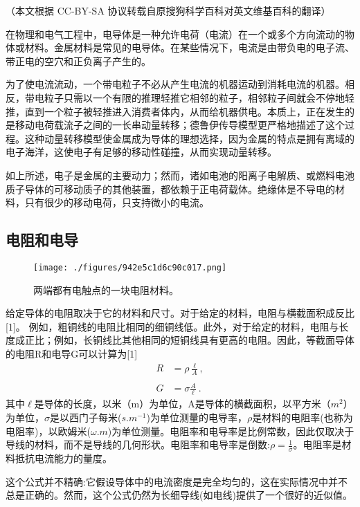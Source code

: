 
（本文根据 CC-BY-SA 协议转载自原搜狗科学百科对英文维基百科的翻译）

在物理和电气工程中，电导体是一种允许电荷（电流）在一个或多个方向流动的物体或材料。金属材料是常见的电导体。在某些情况下，电流是由带负电的电子流、带正电的空穴和正负离子产生的。

为了使电流流动，一个带电粒子不必从产生电流的机器运动到消耗电流的机器。相反，带电粒子只需以一个有限的推理轻推它相邻的粒子，相邻粒子间就会不停地轻推，直到一个粒子被轻推进入消费者体内，从而给机器供电。本质上，正在发生的是移动电荷载流子之间的一长串动量转移；德鲁伊传导模型更严格地描述了这个过程。这种动量转移模型使金属成为导体的理想选择，因为金属的特点是拥有离域的电子海洋，这使电子有足够的移动性碰撞，从而实现动量转移。

如上所述，电子是金属的主要动力；然而，诸如电池的阳离子电解质、或燃料电池质子导体的可移动质子的其他装置，都依赖于正电荷载体。绝缘体是不导电的材料，只有很少的移动电荷，只支持微小的电流。

\subsection{ 电阻和电导}
\begin{figure}[ht]
\centering
\texttt{[image: ./figures/942e5c1d6c90c017.png]}
\caption{两端都有电触点的一块电阻材料。} \label{fig_DDT_1}
\end{figure}
给定导体的电阻取决于它的材料和尺寸。对于给定的材料，电阻与横截面积成反比[1]。 例如，粗铜线的电阻比相同的细铜线低。此外，对于给定的材料，电阻与长度成正比；例如，长铜线比其他相同的短铜线具有更高的电阻。因此，等截面导体的电阻R和电导G可以计算为[1]
\begin{equation}
\begin{aligned}
R &= \rho \frac{\ell}{A}, \\\\
G &= \sigma \frac{A}{\ell}~.
\end{aligned}
\end{equation}
其中$\ell$是导体的长度，以米（m）为单位，A是导体的横截面积，以平方米（$m^2$）为单位，$\sigma$是以西门子每米($s.m^{-1}$)为单位测量的电导率，$\rho$是材料的电阻率(也称为电阻率)，以欧姆米($\omega.m$)为单位测量。电阻率和电导率是比例常数，因此仅取决于导线的材料，而不是导线的几何形状。电阻率和电导率是倒数:$\rho = \frac{1}{\sigma}$。电阻率是材料抵抗电流能力的量度。

这个公式并不精确:它假设导体中的电流密度是完全均匀的，这在实际情况中并不总是正确的。然而，这个公式仍然为长细导线(如电线)提供了一个很好的近似值。

